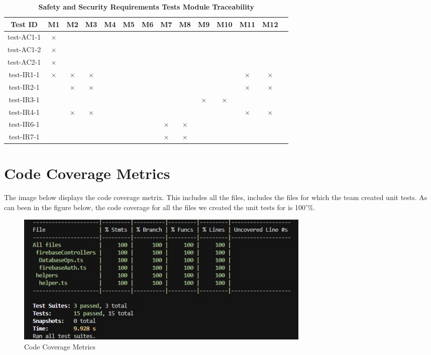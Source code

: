 \documentclass[12pt, titlepage]{article}
\begin{document}
\begin{table} [H]
  \centering
  \begin{tabular}{|c|c|c|c|c|c|c|c|c|c|c|c|c|c|}
  \hline
  Test ID & M1 & M2 & M3 & M4 & M5 & M6 & M7 & M8 & M9 & M10 & M11 & M12 \\
  \hline
  test-AC1-1 & $\times$ & & & & & & & & & & & \\
  \hline
  test-AC1-2 & $\times$ & & & & & & & & & & & \\
  \hline
  test-AC2-1 & $\times$ & & & & & & & & & & & \\
  \hline
  test-IR1-1 & $\times$ & $\times$ & $\times$ & & & & & & & & $\times$ & $\times$\\
  \hline
  test-IR2-1 & & $\times$ & $\times$ & & & & & & & & $\times$ & $\times$\\
  \hline
  test-IR3-1 & & & & & & & & & $\times$ & $\times$ & &\\
  \hline
  test-IR4-1 & & $\times$ & $\times$ & & & & & & & & $\times$ & $\times$\\
  \hline
  test-IR6-1 & & & & & & & $\times$ & $\times$ & & & &\\
  \hline
  test-IR7-1 & & & & & & & $\times$ & $\times$ & & & &\\
  \hline
\end{tabular}
\caption{\bf Safety and Security Requirements Tests Module Traceability} \label{tab:sns-test-traceability}
\end{table}

\newpage

\section{Code Coverage Metrics}

The image below displays the code coverage metrix. This includes all the files, includes the files for which the team created unit tests. As can been in the figure below, the code coverage for all the files we created the unit tests for is 100'\%.

\begin{figure}[h]
  \centering
  \includegraphics[width=0.7\textwidth]{CodeCoverageMetrics.jpg}
  \caption{Code Coverage Metrics}
  \label{FigUH}
\end{figure}
\end{document}
